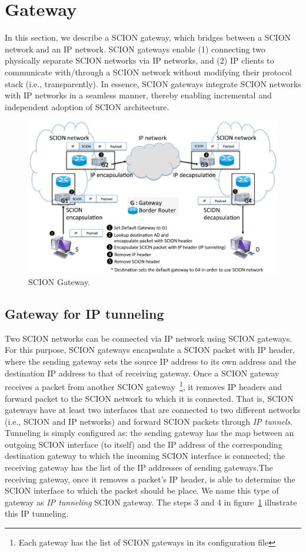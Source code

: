\section{Gateway}
In this section, we describe a SCION gateway, which bridges between a SCION network and an IP network. SCION gateways enable (1) connecting two physically separate SCION networks via IP networks, and (2) IP clients to communicate with/through a SCION network without modifying their protocol stack (i.e., transparently). In essence, SCION gateways integrate SCION networks with IP networks in a seamless manner, thereby enabling incremental and independent adoption of SCION architecture. 

\begin{figure}[ht]
\centering
\includegraphics[width=\columnwidth]{./fig/gateway.eps}
\caption{SCION Gateway.}\label{fig:gateway}
\end{figure}

\subsection{Gateway for IP tunneling}
Two SCION networks can be connected via IP network using SCION gateways. For this purpose, SCION gateways encapsulate a SCION packet with IP header, where the sending gateway sets the source IP address to its own address and the destination IP address to that of receiving gateway. Once a SCION gateway receives a packet from another SCION gateway~\footnote{Each gateway has the list of SCION gateways in its configuration file}, it removes IP headers and forward packet to the SCION network to which it is connected. That is, SCION gateways have at least two interfaces that are connected to two different networks (i.e., SCION and IP networks) and forward SCION packets through {\em IP tunnels}. Tunneling is simply configured as: the sending gateway has the map between an outgoing SCION interface (to itself) and the IP address of the corresponding destination gateway to which the incoming SCION interface is connected; the receiving gateway has the list of the IP addresses of sending gateways.The receiving gateway, once it removes a packet's IP header, is able to determine the SCION interface to which the packet should be place. We name this type of gateway as {\em IP tunneling} SCION gateway. The steps 3 and 4 in figure~\ref{fig:gateway} illustrate this IP tunneling. 

